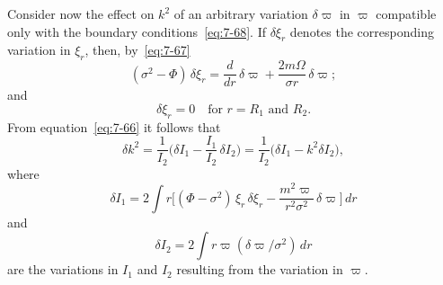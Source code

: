 Consider now the effect on $k^2$ of an arbitrary variation $\delta\varpi$ in $\varpi$ compatible only with the boundary conditions~\eqref{eq:7-68}.  If $\delta\xi_r$ denotes the corresponding variation in $\xi_r$, then, by~\eqref{eq:7-67}
\begin{equation}
\label{eq:7-69}
(\sigma^2-\Phi)\,\delta\xi_r = \frac{d}{dr}\,\delta\varpi
+ \frac{2m\Omega}{\sigma r}\,\delta\varpi;
\end{equation}
and
\begin{equation}
\label{eq:7-70}
\delta\xi_r = 0 \quad \text{for } r = R_1 \text{ and } R_2.
\end{equation}
From equation~\eqref{eq:7-66} it follows that
\begin{equation}
\label{eq:7-71}
\delta k^2 = \frac{1}{I_2}\bigl(\delta I_1 - \frac{I_1}{I_2}\,\delta I_2\bigr)
= \frac{1}{I_2}\bigl(\delta I_1 - k^2 \delta I_2\bigr),
\end{equation}
where
\begin{equation}
\label{eq:7-72}
\delta I_1 = 2\int r\bigl[(\Phi-\sigma^2)\,\xi_r\,\delta\xi_r
- \frac{m^2\varpi}{r^2\sigma^2}\,\delta\varpi\bigr]\,dr
\end{equation}
and
\begin{equation}
\label{eq:7-73}
\delta I_2 = 2\int r\varpi(\delta\varpi/\sigma^2)\,dr
\end{equation}
are the variations in $I_1$ and $I_2$ resulting from the variation in $\varpi$.

